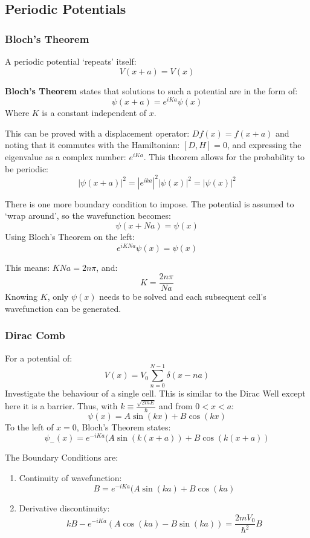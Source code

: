 \documentclass[12pt]{article}
\begin{document}
\subsection{Periodic Potentials}

\subsubsection{Bloch's Theorem}
A periodic potential `repeats' itself: \[V(x+a) = V(x)\]


\textbf{Bloch's Theorem} states that solutions to such a potential are in the form of:
\[\boxed{\psi(x+a) = e^{iKa}\psi(x)}\]
Where $K$ is a constant independent of $x$.


This can be proved with a displacement operator: $Df(x) = f(x+a)$ and noting that it commutes with the Hamiltonian: $[D,H] = 0$, and expressing the eigenvalue as a complex number: $e^{iKa}$. This theorem allows for the probability to be periodic:
\[|\psi(x+a)|^2 = |e^{ika}|^2|\psi(x)|^2 = |\psi(x)|^2\]


There is one more boundary condition to impose. The potential is assumed to `wrap around', so the wavefunction becomes:
\[\psi(x+Na) = \psi(x)\]
Using Bloch's Theorem on the left:
\[e^{iKNa}\psi(x) = \psi(x)\]

This means: \(KNa = 2n\pi\), and:
\[ K = \frac{2n\pi}{Na}\]
Knowing $K$, only $\psi(x)$ needs to be solved and each subsequent cell's wavefunction can be generated.

\subsubsection{Dirac Comb}
For a potential of:
\[ V(x) = V_0\sum_{n=0}^{N-1}\delta(x-na)\]
Investigate the behaviour of a single cell. This is similar to the Dirac Well except here it is a barrier. Thus, with $k \equiv \frac{\sqrt{2mE}}{\hbar}$ and from $0<x<a$:
\[\psi(x) = A\sin{(kx)} + B\cos{(kx)} \]
To the left of $x=0$, Bloch's Theorem states:
\[ \psi_{-}(x) = e^{-iKa}(A\sin{(k(x+a))} + B\cos{(k(x+a))}\]

The Boundary Conditions are:
\begin{enumerate}
    \item Continuity of wavefunction:
    \[B = e^{-iKa}(A\sin{(ka)} + B\cos{(ka)}\]
    \item Derivative discontinuity:
    \[kB - e^{-iKa}(A\cos{(ka)} - B\sin{(ka)})=\frac{2mV_0}{\hbar^2}B\]
\end{enumerate}
\end{document}
